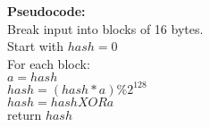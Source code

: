 \documentclass{article}
\begin{document}
{\bf Pseudocode: } \\
Break input into blocks of 16 bytes. \\
Start with $hash = 0$ \\
For each block: \\
    $a = hash$ \\
    $hash = (hash * a) \% 2^{128}$ \\
    $hash = hash XOR a$ \\
return $hash$
\end{document}
